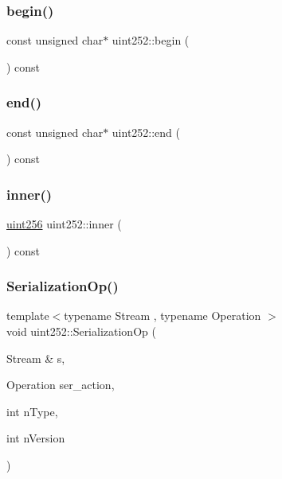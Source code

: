 \subsubsection{\texorpdfstring{begin()}{begin()}}
{\footnotesize\ttfamily const unsigned char$\ast$ uint252\+::begin (\begin{DoxyParamCaption}{ }\end{DoxyParamCaption}) const\hspace{0.3cm}{\ttfamily [inline]}}

\mbox{\label{classuint252_ac46520a9447f4aef329e239f63ecf98f}} 
\subsubsection{\texorpdfstring{end()}{end()}}
{\footnotesize\ttfamily const unsigned char$\ast$ uint252\+::end (\begin{DoxyParamCaption}{ }\end{DoxyParamCaption}) const\hspace{0.3cm}{\ttfamily [inline]}}

\mbox{\label{classuint252_ac8ebb65ad534ef0aff44405b0c639c24}} 
\subsubsection{\texorpdfstring{inner()}{inner()}}
{\footnotesize\ttfamily \mbox{\hyperlink{classuint256}{uint256}} uint252\+::inner (\begin{DoxyParamCaption}{ }\end{DoxyParamCaption}) const\hspace{0.3cm}{\ttfamily [inline]}}

\mbox{\label{classuint252_a424a69052206106ea1f8e5b31ee59248}} 
\subsubsection{\texorpdfstring{Serialization\+Op()}{SerializationOp()}}
{\footnotesize\ttfamily template$<$typename Stream , typename Operation $>$ \\
void uint252\+::\+Serialization\+Op (\begin{DoxyParamCaption}\item[{Stream \&}]{s,  }\item[{Operation}]{ser\+\_\+action,  }\item[{int}]{n\+Type,  }\item[{int}]{n\+Version }\end{DoxyParamCaption})\hspace{0.3cm}{\ttfamily [inline]}}



